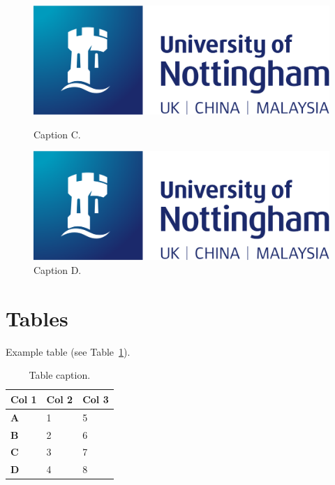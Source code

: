 \begin{figure}[h]
    \centering
    \begin{minipage}[h]{0.45\textwidth}
        \centering
        \includegraphics[width=\textwidth]{images/nottingham-logo.png}
        \caption{Caption C.}
        \label{fig:captionc}
    \end{minipage}
    \hfill
    \begin{minipage}[h]{0.45\textwidth}
        \centering
        \includegraphics[width=\textwidth]{images/nottingham-logo.png}
        \caption{Caption D.}
        \label{fig:captiond}
    \end{minipage}
\end{figure}


\section{Tables}

Example table (see Table~\ref{tb:table-example}). 

\begin{table}[h]
\caption{Table caption.}
\label{tb:table-example}
\begin{tabularx}{\textwidth}{XXX}
\toprule
\textbf{Col 1} & \textbf{Col 2} & \textbf{Col 3} \\ \midrule
\textbf{A}     & 1              & 5              \\
\textbf{B}     & 2              & 6              \\
\textbf{C}     & 3              & 7              \\
\textbf{D}     & 4              & 8              \\ \bottomrule
\end{tabularx}%
\end{table}


